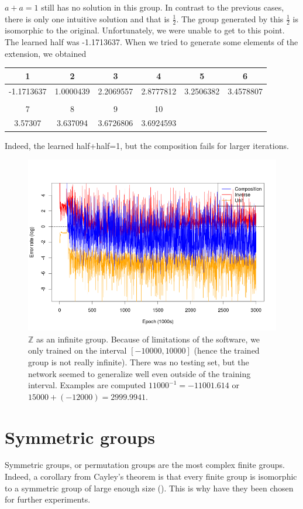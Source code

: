 $a+a=1$ still has no solution in this group. In contrast to the previous cases, there is only one intuitive solution and that is $\frac{1}{2}$. The group generated by this $\frac{1}{2}$ is isomorphic to the original. Unfortunately, we were unable to get to this point. The learned half was 
-1.1713637. When we tried to generate some elements of the extension, we obtained

\begin{tabular}{cccccc}
1&2&3&4&5&6\\
\hline
-1.1713637&1.0000439&2.2069557&2.8777812&3.2506382&3.4578807\\
 \\
7&8&9&10\\
\hline 
3.57307&3.637094&3.6726806&3.6924593
\end{tabular}

Indeed, the learned half+half=1, but the composition fails for larger iterations.
\begin{figure}
\caption{$\mathbb{Z}$ as an infinite group. Because of limitations of the software, we only trained on the interval $[-10000,10000]$ (hence the trained group is not really infinite). There was no testing set, but the network seemed to generalize well even outside of the training interval. Examples are computed $11000^{-1}=-11001.614$ or $15000+(-12000)=2999.9941$.}
\centering
\label{graph:z_inf}
\includegraphics[width=\linewidth]{../img/z_inf.png}
\end{figure}

\section{Symmetric groups}
Symmetric groups, or permutation groups are the most complex finite groups. Indeed, a corollary from Cayley's theorem  is that every finite group is isomorphic to a symmetric group of large enough size (\cite{cayley}). This is why have they been chosen for further experiments.

